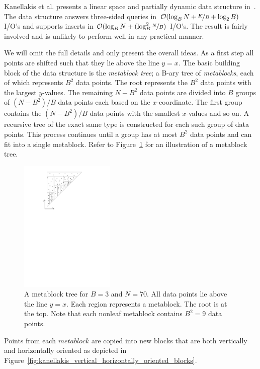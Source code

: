 \documentclass[twoside,11pt,openright]{report}
\begin{document}
Kanellakis et al. presents a linear space and partially dynamic data structure in~\cite{Kanellakis1996589}. The data structure answers three-sided queries in $\mathcal{O}(\log_B N + \nicefrac{K}{B} + \log_2 B)$ I/O's and supports inserts in $\mathcal{O}(\log_B N + (\log^2_B \nicefrac{N}{B})$ I/O's. The result is fairly involved and is unlikely to perform well in any practical manner.

We will omit the full details and only present the overall ideas. As a first step all points are shifted such that they lie above the line $y = x$. The basic building block of the data structure is the \textit{metablock tree}; a B-ary tree of \textit{metablocks}, each of which represents $B^2$ data points. The root represents the $B^2$ data points with the largest $y$-values. The remaining $N - B^2$ data points are divided into $B$ groups of $(N - B^2)/B$ data points each based on the $x$-coordinate. The first group contains the $(N - B^2)/B$ data points with the smallest $x$-values and so on. A recursive tree of the exact same type is constructed for each such group of data points. This process continues until a group has at most $B^2$ data points and can fit into a single metablock. Refer to Figure~\ref{fig:kanellakis_metablock_tree} for an illustration of a metablock tree.

\begin{figure}[H]
	\centering
		\includegraphics[width=0.40\textwidth]{../figures/kanellakis_metablock_tree}
	\caption{A metablock tree for $B=3$ and $N=70$. All data points lie above the line $y=x$. Each region represents a metablock. The root is at the top. Note that each nonleaf metablock contains $B^2 = 9$ data points.}
	\label{fig:kanellakis_metablock_tree}
\end{figure}

Points from each $metablock$ are copied into new blocks that are both vertically and horizontally oriented as depicted in Figure~\ref{fig:kanellakis_vertical_horizontally_oriented_blocks}. 
\end{document}
